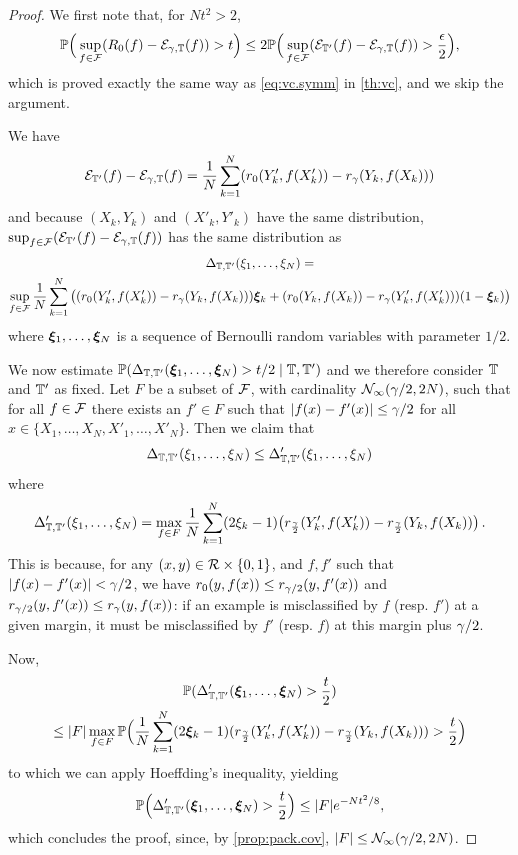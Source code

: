 \begin{proof}
We first note that, for $Nt^2 > 2$, 
\[
\bm{\mathbb P}\Big(\sup_{f\in{\mathcal F}} (R_0(f) -  {\mathcal E}_{\gamma, {\mathbb T}}(f)) > t\Big) \leq 2 \bm{\mathbb P}\Big(\sup_{f\in{\mathcal F}} ({\mathcal E}_{{\mathbb T}'}(f) - {\mathcal E}_{\gamma, {\mathbb T}}(f)) > \frac{\epsilon} 2\Big),
\]
which is proved exactly the same way as \cref{eq:vc.symm} in  \cref{th:vc}, and we skip the argument. 

We have  
\[
{\mathcal E}_{{\mathbb T}'}(f) - {\mathcal E}_{\gamma, {\mathbb T}}(f) = \frac1N \sum_{k=1}^N (r_0(Y'_k, f(X'_k)) - r_\gamma(Y_k, f(X_k)))
\]
and because $(X_k, Y_k)$ and $(X'_k, Y'_k)$ have the same distribution, $\sup_{f\in{\mathcal F}} ({\mathcal E}_{{\mathbb T}'}(f) - {\mathcal E}_{\gamma, {\mathbb T}}(f))$ has the same distribution as
\begin{multline*}
\Delta_{{\mathbb T}, {\mathbb T}'}(\xi_1, \ldots, \xi_N) = \\
\sup_{f\in{\mathcal F}} \frac1N \sum_{k=1}^N \big((r_0(Y'_k, f(X'_k)) - r_\gamma(Y_k, f(X_k))){\bm{\xi}}_k + (r_0(Y_k, f(X_k)) - r_\gamma(Y'_k, f(X'_k)))(1-{\bm{\xi}}_k)\big)
\end{multline*}
where ${\bm{\xi}}_1, \ldots, {\bm{\xi}}_N$ is a sequence of Bernoulli random variables with parameter $1/2$. 

We now estimate $\bm{\mathbb P}(\Delta_{{\mathbb T}, {\mathbb T}'}({\bm{\xi}}_1, \ldots, {\bm{\xi}}_N) > t/2\mid {\mathbb T}, {\mathbb T}')$ and we therefore consider ${\mathbb T}$ and ${\mathbb T}'$ as fixed.  Let $F$ be a subset of ${\mathcal F}$, with cardinality ${\mathcal N}_\infty(\gamma/2, 2N)$, such that for all $f\in{\mathcal F}$ there exists an $f'\in F$ such that $|f(x) - f'(x)| \leq \gamma/2$ for all $x\in \{X_1, \ldots, X_N, X'_1, \ldots, X'_N\}$. Then  we claim that 
\[
\Delta_{{\mathbb T}, {\mathbb T}'}(\xi_1, \ldots, \xi_N) \leq \Delta'_{{\mathbb T}, {\mathbb T}'}(\xi_1, \ldots, \xi_N)
\]
where 
\[
\Delta'_{{\mathbb T}, {\mathbb T}'}(\xi_1, \ldots, \xi_N) = 
\max_{f\in F} \frac1N \sum_{k=1}^N (2\xi_k-1) \big(r_{\frac{\gamma}2}(Y'_k, f(X'_k)) - r_{\frac{\gamma}2}(Y_k, f(X_k))\big)\,.
\]
This is because, for any $(x,y)\in {\mathcal R}\times\{0,1\}$, and $f, f'$ such that $|f(x) -  f'(x)| < \gamma/2$, we have
$r_0(y, f(x)) \leq r_{\gamma/2}(y, f'(x))$ and $r_{\gamma/2}(y, f'(x)) \leq r_\gamma(y, f(x))$: if an example is misclassified by $f$ (resp. $f'$) at a given margin, it must be misclassified by $f'$ (resp. $f$) at this margin plus $\gamma/2$.    

Now, 
\begin{multline*}
\bm{\mathbb P}(\Delta'_{{\mathbb T}, {\mathbb T}'}({\bm{\xi}}_1, \ldots, {\bm{\xi}}_N)>\frac t2) \\
\leq |F| \max_{f\in F} \bm{\mathbb P}\Big(\frac1N \sum_{k=1}^N (2{\bm{\xi}}_k-1) (r_{\frac{\gamma}2}(Y'_k, f(X'_k)) - r_{\frac{\gamma}2}(Y_k, f(X_k))) >\frac t 2\Big)
\end{multline*}
to which we can apply Hoeffding's inequality, yielding
\[
\bm{\mathbb P}\Big(\Delta'_{{\mathbb T}, {\mathbb T}'}({\bm{\xi}}_1, \ldots, {\bm{\xi}}_N)>\frac t2\Big) \leq |F| e^{-{Nt^2}/8},
\]
which concludes the proof, since, by \cref{prop:pack.cov}, $|F|\leq {\mathcal N}_\infty({\gamma}/2, 2N)$.

\end{proof}


